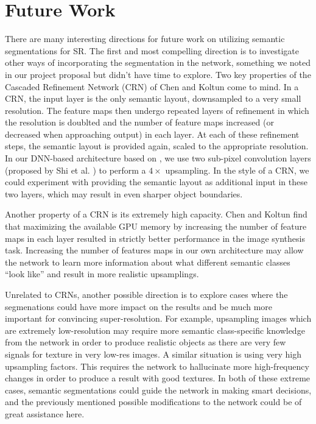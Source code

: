 \documentclass[10pt,twocolumn,letterpaper]{article}
\begin{document}
\section{Future Work}
There are many interesting directions for future work on utilizing semantic
segmentations for SR. The first and most compelling direction is to investigate
other ways of incorporating the segmentation in the network, something we noted
in our project proposal but didn't have time to explore. Two key properties of
the Cascaded Refinement Network (CRN) of Chen and Koltun \cite{ImageSynthesis}
come to mind. In a CRN, the input layer is the only semantic layout,
downsampled to a very small resolution. The feature maps then undergo repeated
layers of refinement in which the resolution is doublted and the number of
feature maps increased (or decreased when approaching output) in each layer. At
each of these refinement steps, the semantic layout is provided again, scaled
to the appropriate resolution. In our DNN-based architecture based on
\cite{SRGAN}, we use two sub-pixel convolution layers (proposed by Shi et al.
\cite{SubPixelConv}) to perform a $4 \times$ upsampling. In the style of a CRN,
we could experiment with providing the semantic layout as additional input in
these two layers, which may result in even sharper object boundaries.

Another property of a CRN is its extremely high capacity. Chen and Koltun find
that maximizing the available GPU memory by increasing the number of feature
maps in each layer resulted in strictly better performance in the image
synthesis task.  Increasing the number of features maps in our own architecture
may allow the network to learn more information about what different semantic
classes ``look like'' and result in more realistic upsamplings.

Unrelated to CRNs, another possible direction is to explore cases where the
segmenations could have more impact on the results and be much more important
for convincing super-resolution. For example, upsampling images which are
extremely low-resolution may require more semantic class-specific knowledge
from the network in order to produce realistic objects as there are very few
signals for texture in very low-res images. A similar situation is using very
high upsampling factors. This requires the network to hallucinate more
high-frequency changes in order to produce a result with good textures. In both
of these extreme cases, semantic segmentations could guide the network in
making smart decisions, and the previously mentioned possible modifications to
the network could be of great assistance here.

{\small


}
\end{document}
